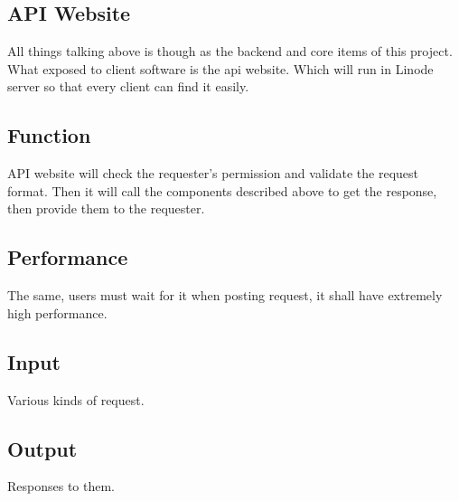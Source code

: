 
\subsection{API Website}
  All things talking above is though as the backend and core items of this project.
  What exposed to client software is the api website. Which will run in Linode server so that every client can find it easily.

  \subsection{Function}
    API website will check the requester's permission and validate the request format.
    Then it will call the components described above to get the response, then provide them to the requester.

  \subsection{Performance}
    The same, users must wait for it when posting request, it shall have extremely high performance.

  \subsection{Input}
    Various kinds of request.

  \subsection{Output}
    Responses to them.

